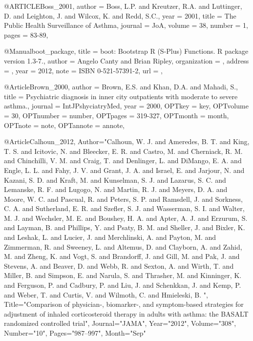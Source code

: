 {{@ARTICLE{Boss_2001,
  author = {Boss, L.P. and Kreutzer, R.A. and Luttinger, D. and Leighton, J. and Wilcox, K. and Redd, S.C.},
  year = {2001},
  title = {The Public Health Surveillance of Asthma},
  journal = JoA,
  volume =  {38},
  number = {1},
  pages = {83-89},
}

@Manual{boot_package,
    title = {boot: Bootstrap R (S-Plus) Functions. R package
  version 1.3-7.},
    author = {{Angelo Canty and Brian Ripley}},
    organization = {},
    address = {},
    year = {2012},
    note = {{ISBN} 0-521-57391-2},
    url = {},
}


@Article{Brown_2000,
author = {Brown, E.S. and Khan, D.A. and Mahadi, S.},
title = {Psychiatric diagnosis in inner city outpatients with moderate to severe asthma.},
journal = {IntJPshyciatryMed},
year = {2000},
OPTkey = {key},
OPTvolume = {30},
OPTnumber = {number},
OPTpages = {319-327},
OPTmonth = {month},
OPTnote = {note},
OPTannote = {annote},
}



@Article{Calhoun_2012,
   Author="Calhoun, W. J.  and Ameredes, B. T.  and King, T. S.  and Icitovic, N.  and Bleecker, E. R.  and Castro, M.  and Cherniack, R. M.  and Chinchilli, V. M.  and Craig, T.  and Denlinger, L.  and DiMango, E. A.  and Engle, L. L.  and Fahy, J. V.  and Grant, J. A.  and Israel, E.  and Jarjour, N.  and Kazani, S. D.  and Kraft, M.  and Kunselman, S. J.  and Lazarus, S. C.  and Lemanske, R. F.  and Lugogo, N.  and Martin, R. J.  and Meyers, D. A.  and Moore, W. C.  and Pascual, R.  and Peters, S. P.  and Ramsdell, J.  and Sorkness, C. A.  and Sutherland, E. R.  and Szefler, S. J.  and Wasserman, S. I.  and Walter, M. J.  and Wechsler, M. E.  and Boushey, H. A.  and Apter, A. J.  and Erzurum, S.  and Layman, B.  and Phillips, Y.  and Psaty, B. M.  and Sheller, J.  and Bixler, K.  and Leshak, L.  and Lucier, J.  and Merchlinski, A.  and Payton, M.  and Zimmerman, R.  and Sweeney, L.  and Altemus, D.  and Clayborn, A.  and Zahid, M.  and Zheng, K.  and Vogt, S.  and Brandorff, J.  and Gill, M.  and Pak, J.  and Stevens, A.  and Beaver, D.  and Webb, R.  and Sexton, A.  and Wirth, T.  and Miller, B.  and Simpson, E.  and Narula, S.  and Thrasher, M.  and Kinninger, K.  and Ferguson, P.  and Cadbury, P.  and Liu, J.  and Schenkkan, J.  and Kemp, P.  and Weber, T.  and Curtis, V.  and Wilmoth, C.  and Hmieleski, B. ",
   Title="{{C}omparison of physician-, biomarker-, and symptom-based strategies for adjustment of inhaled corticosteroid therapy in adults with asthma: the {B}{A}{S}{A}{L}{T} randomized controlled trial}",
   Journal="JAMA",
   Year="2012",
   Volume="308",
   Number="10",
   Pages="987--997",
   Month="Sep"
}


}}
